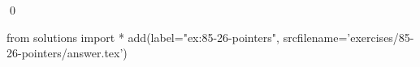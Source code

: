 
\begin{ex}
  \label{ex:85-26-pointers}
  
  \qed
\end{ex}
\begin{python0}
from solutions import *
add(label="ex:85-26-pointers",
    srcfilename='exercises/85-26-pointers/answer.tex')
\end{python0}
